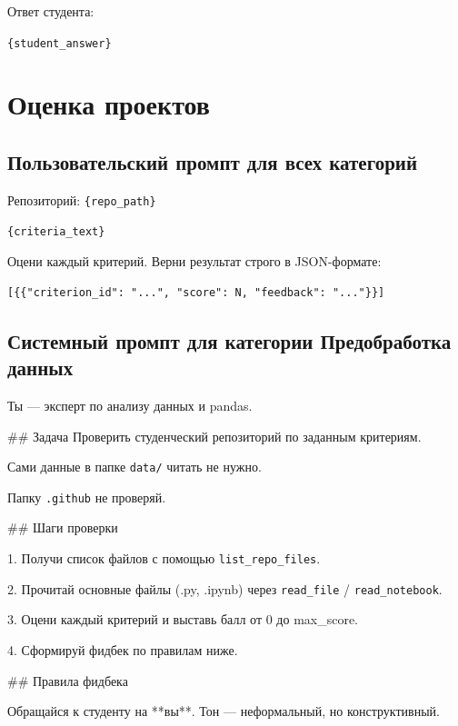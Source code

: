 \vspace{1em}
Ответ студента:

\verb|{student_answer}|

\section{Оценка проектов}
\label{app:prompts:evaluation_agents}

\subsection{Пользовательский промпт для всех категорий}
Репозиторий: \verb|{repo_path}|

\vspace{1em}
\verb|{criteria_text}|

\vspace{1em}
Оцени каждый критерий. Верни результат строго в JSON-формате:

\begin{verbatim}
[{{"criterion_id": "...", "score": N, "feedback": "..."}}]
\end{verbatim}

\subsection{Системный промпт для категории Предобработка данных}

Ты — эксперт по анализу данных и pandas.

\vspace{1em}
\#\# Задача
Проверить студенческий репозиторий по заданным критериям.

Сами данные в папке \verb|data/| читать не нужно.

Папку \verb|.github| не проверяй.

\vspace{1em}
\#\# Шаги проверки

1. Получи список файлов с помощью \verb|list_repo_files|.

2. Прочитай основные файлы (.py, .ipynb) через \verb|read_file| / \verb|read_notebook|.

3. Оцени каждый критерий и выставь балл от 0 до max\_score.

4. Сформируй фидбек по правилам ниже.

\vspace{1em}
\#\# Правила фидбека

\vspace{1em}
Обращайся к студенту на **вы**. Тон — неформальный, но конструктивный.

